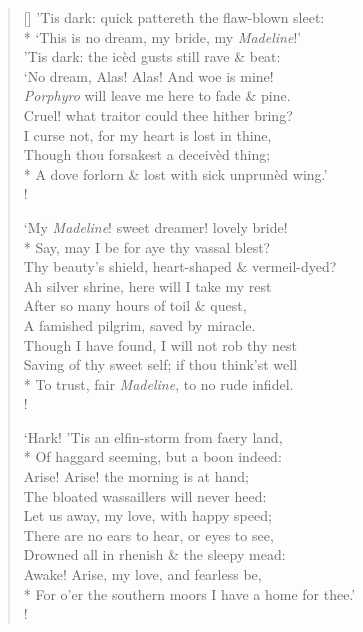 \documentclass[MAIN]{subfiles}
\begin{document}
\begin{verse}[\versewidth]
\vin 'Tis dark: quick pattereth the flaw-blown sleet:\\*
\vin `This is no dream, my bride, my \emph{Madeline}!'\\
\vin 'Tis dark: the ic\`ed gusts still rave \& beat:\\
\vin `No dream, Alas! Alas! And woe is mine!\\
\vin \emph{Porphyro} will leave me here to fade \& pine.\\
\vin Cruel! what traitor could thee hither bring?\\
\vin I curse not, for my heart is lost in thine,\\
\vin Though thou forsakest a deceiv\`ed thing;\\*
A dove forlorn \& lost with sick unprun\`ed wing.'\\!

\vin `My \emph{Madeline}! sweet dreamer! lovely bride!\\*
\vin Say, may I be for aye thy vassal blest?\\
\vin Thy beauty's shield, heart-shaped \& vermeil-dyed?\\
\vin Ah silver shrine, here will I take my rest\\
\vin After so many hours of toil \& quest,\\
\vin A famished pilgrim, saved by miracle.\\
\vin Though I have found, I will not rob thy nest\\
\vin Saving of thy sweet self; if thou think'st well\\*
To trust, fair \emph{Madeline}, to no rude infidel.\\!

\vin `Hark! 'Tis an elfin-storm from faery land,\\*
\vin Of haggard seeming, but a boon indeed:\\
\vin Arise! Arise! the morning is at hand;\\
\vin The bloated wassaillers will never heed:\\
\vin Let us away, my love, with happy speed;\\
\vin There are no ears to hear, or eyes to see,\\
\vin Drowned all in rhenish \& the sleepy mead:\\
\vin Awake! Arise, my love, and fearless be,\\*
For o'er the southern moors I have a home for thee.'\\!


\end{verse}
\end{document}
